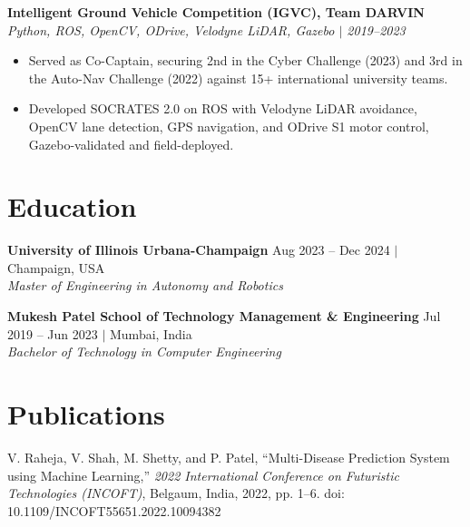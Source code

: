 \documentclass[9pt, a4paper]{article}
\newcommand{\projheader}[2]{%
  \textbf{#1} \hfill \textit{#2}%
}
\begin{document}
\projheader{Intelligent Ground Vehicle Competition (IGVC), Team DARVIN}{Python, ROS, OpenCV, ODrive, Velodyne LiDAR, Gazebo $|$ 2019--2023}
\begin{itemize}[leftmargin=1.2em, topsep=2pt, itemsep=0pt, parsep=0pt]
  \item Served as Co-Captain, securing 2nd in the Cyber Challenge (2023) and 3rd in the Auto-Nav Challenge (2022) against 15+ international university teams.
  \item Developed SOCRATES 2.0 on ROS with Velodyne LiDAR avoidance, OpenCV lane detection, GPS navigation, and ODrive S1 motor control, Gazebo-validated and field-deployed.
\end{itemize}

\section{Education}

\textbf{University of Illinois Urbana-Champaign} \hfill Aug 2023 – Dec 2024 $|$ Champaign, USA\\
\textit{Master of Engineering in Autonomy and Robotics}

\vspace{1pt}
\textbf{Mukesh Patel School of Technology Management \& Engineering} \hfill Jul 2019 – Jun 2023 $|$ Mumbai, India\\
\textit{Bachelor of Technology in Computer Engineering}

\section{Publications}
V. Raheja, V. Shah, M. Shetty, and P. Patel, ``Multi-Disease Prediction System using Machine Learning,'' \textit{2022 International Conference on Futuristic Technologies (INCOFT)}, Belgaum, India, 2022, pp. 1--6. doi: 10.1109/INCOFT55651.2022.10094382
\end{document}
